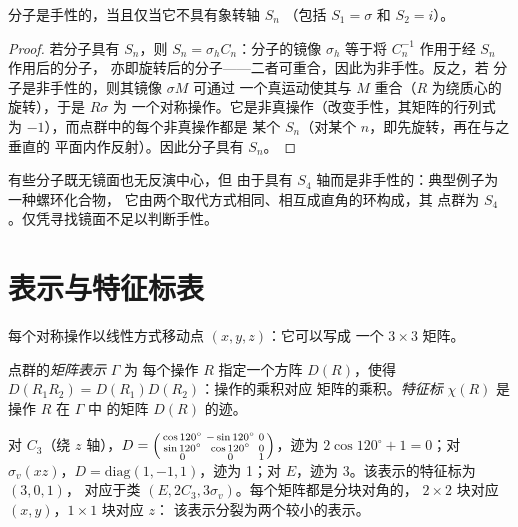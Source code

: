 \begin{theorem}[手性分子]\label{thm:b3:point-groups:chiral}
分子是手性的，当且仅当它不具有象转轴 $S_n$
（包括 $S_1 = \sigma$ 和 $S_2 = i$）。
\end{theorem}

\begin{proof}
若分子具有 $S_n$，则 $S_n = \sigma_hC_n$：分子的镜像 $\sigma_h$
等于将 $C_n^{-1}$ 作用于经 $S_n$ 作用后的分子，
亦即旋转后的分子——二者可重合，因此为非手性。反之，若
分子是非手性的，则其镜像 $\sigma M$ 可通过
一个真运动使其与 $M$ 重合（$R$ 为绕质心的旋转），于是 $R\sigma$ 为
一个对称操作。它是非真操作（改变手性，其矩阵的行列式
为 $-1$），而点群中的每个非真操作都是
某个 $S_n$（对某个 $n$，即先旋转，再在与之垂直的
平面内作反射）。因此分子具有 $S_n$。
\end{proof}

\begin{example}[无镜面的非手性分子]\label{ex:b3:point-groups:s4}
有些分子既无镜面也无反演中心，但
由于具有 $S_4$ 轴而是非手性的：典型例子为一种螺环化合物，
它由两个取代方式相同、相互成直角的环构成，其
点群为 $S_4$。仅凭寻找镜面不足以判断手性。
\end{example}

\section{表示与特征标表}

每个对称操作以线性方式移动点 $(x, y, z)$：它可以写成
一个 $3\times3$ 矩阵。

\begin{definition}\label{def:b3:point-groups:representation}
点群的\emph{矩阵表示} $\Gamma$ 为
每个操作 $R$ 指定一个方阵 $D(R)$，使得
$D(R_1R_2) = D(R_1)D(R_2)$：操作的乘积对应
矩阵的乘积。\emph{特征标} $\chi(R)$ 是操作 $R$ 在 $\Gamma$ 中
的矩阵 $D(R)$ 的迹。
\end{definition}

\begin{example}[$C_{3v}$ 的坐标]\label{ex:b3:point-groups:xyz}
对 $C_3$（绕 $z$ 轴），$D = \begin{psmallmatrix}\cos120^\circ & -\sin120^\circ &
0\\ \sin120^\circ & \cos120^\circ & 0\\ 0 & 0 & 1\end{psmallmatrix}$，迹为
$2\cos120^\circ + 1 = 0$；对 $\sigma_v(xz)$，$D = \mathrm{diag}(1, -1, 1)$，迹为
1；对 $E$，迹为 3。该表示的特征标为 $(3, 0, 1)$，
对应于类 $(E, 2C_3, 3\sigma_v)$。每个矩阵都是分块对角的，
$2\times2$ 块对应 $(x, y)$，$1\times1$ 块对应 $z$：
该表示分裂为两个较小的表示。
\end{example}

